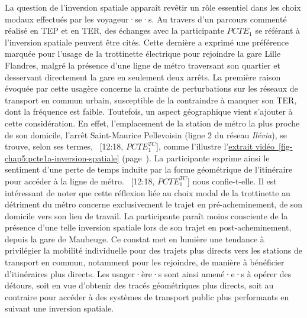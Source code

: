 \begin{refsegment}
La question de l'inversion spatiale apparaît revêtir un rôle essentiel dans les choix modaux effectués par les voyageur·se·s. Au travers d'un parcours commenté réalisé en \acrshort{TEP} et en \acrshort{TER}, des échanges avec la participante \(PCTE_{1}\) se référant à l'inversion spatiale peuvent être cités. Cette dernière a exprimé une préférence marquée pour l'usage de la trottinette électrique pour rejoindre la gare Lille Flandres, malgré la présence d'une ligne de métro traversant son quartier et desservant directement la gare en seulement deux arrêts. La première raison évoquée par cette usagère concerne la crainte de perturbations sur les réseaux de transport en commun urbain, susceptible de la contraindre à manquer son \acrshort{TER}, dont la fréquence est faible. Toutefois, un aspect géographique vient s'ajouter à cette considération. En effet, l'emplacement de la station de métro la plus proche de son domicile, l'arrêt Saint-Maurice Pellevoisin (ligne 2 du réseau \textsl{Ilévia}), se trouve, selon ses termes, ~[12:18, \(PCTE^{TC}_{1}\)], comme l'illustre l'\hyperref[fig-chap5:pcte1a-inversion-spatiale]{extrait vidéo~\ref{fig-chap5:pcte1a-inversion-spatiale}} (page~\pageref{fig-chap5:pcte1a-inversion-spatiale}). La participante exprime ainsi le sentiment d'une perte de temps induite par la forme géométrique de l'itinéraire pour accéder à la ligne de métro. ~[12:18, \(PCTE^{TC}_{1}\)] nous confie-t-elle. Il est intéressant de noter que cette réflexion liée au choix modal de la trottinette au détriment du métro concerne exclusivement le trajet en pré-acheminement, de son domicile vers son lieu de travail. La participante paraît moins consciente de la présence d'une telle inversion spatiale lors de son trajet en post-acheminement, depuis la gare de Maubeuge. Ce constat met en lumière une tendance à privilégier la mobilité individuelle pour des trajets plus directs vers les stations de transport en commun, notamment pour les rejoindre, de manière à bénéficier d'itinéraires plus directs. Les usager·ère·s sont ainsi amené·e·s à opérer des détours, soit en vue d'obtenir des tracés géométriques plus directs, soit au contraire pour accéder à des systèmes de transport public plus performants en suivant une inversion spatiale.%


\end{refsegment}
